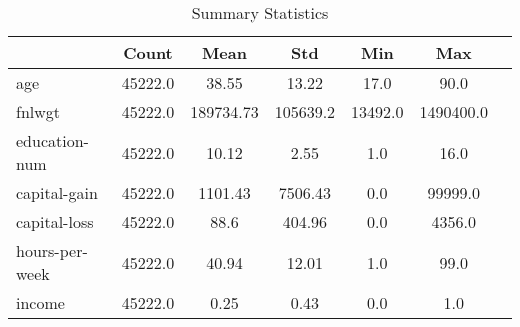\begin{table}[ht]
\centering
\caption{Summary Statistics}
\label{tab:summary_stats}
\begin{tabular}{lcccccc}
\toprule
 & \textbf{Count} & \textbf{Mean} & \textbf{Std} & \textbf{Min} & \textbf{Max} \\
\midrule
age & 45222.0 & 38.55 & 13.22 & 17.0 & 90.0 \\
fnlwgt & 45222.0 & 189734.73 & 105639.2 & 13492.0 & 1490400.0 \\
education-num & 45222.0 & 10.12 & 2.55 & 1.0 & 16.0 \\
capital-gain & 45222.0 & 1101.43 & 7506.43 & 0.0 & 99999.0 \\
capital-loss & 45222.0 & 88.6 & 404.96 & 0.0 & 4356.0 \\
hours-per-week & 45222.0 & 40.94 & 12.01 & 1.0 & 99.0 \\
income & 45222.0 & 0.25 & 0.43 & 0.0 & 1.0 \\
\bottomrule
\end{tabular}
\end{table}
